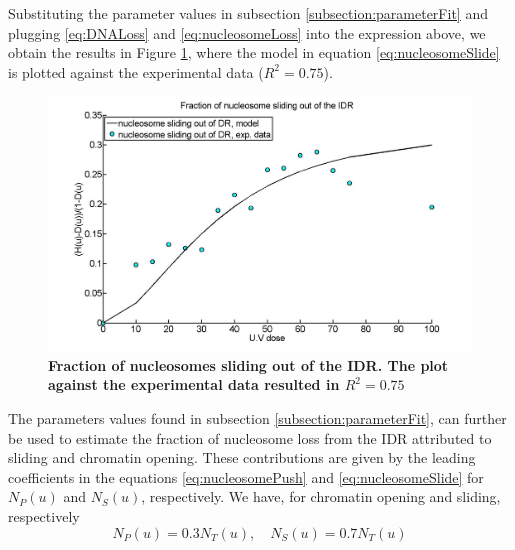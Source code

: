 \documentclass[12pt]{article}
\begin{document}
Substituting the parameter values in subsection \ref{subsection:parameterFit} and plugging \eqref{eq:DNALoss} and \eqref{eq:nucleosomeLoss} into the expression above, we obtain the results in Figure \ref{fig:fractionSlidingOutOfIDR}, where the model
in equation \eqref{eq:nucleosomeSlide} is plotted against the experimental data ($R^2 = 0.75$).

\begin{figure}
\centering
\includegraphics[width=0.5\linewidth, height=0.3\textheight]{fractionSlidingOutOfIDR}
\caption{\textbf{Fraction of nucleosomes sliding out of the IDR. The plot
		against the experimental data resulted in $R^2 = 0.75$}}
\label{fig:fractionSlidingOutOfIDR}
\end{figure}

The parameters values found in subsection \ref{subsection:parameterFit}, can further be used to estimate the fraction of nucleosome loss from the IDR attributed to sliding and
chromatin opening. These contributions are given by the leading coefficients
in the equations \eqref{eq:nucleosomePush} and \eqref{eq:nucleosomeSlide} for $N_P(u)$ and $N_S(u)$, respectively. We have, for
chromatin opening and sliding, respectively
\begin{equation*}
N_P(u) = 0.3N_T(u),\quad N_S(u) = 0.7N_T(u)
\end{equation*}
\end{document}
